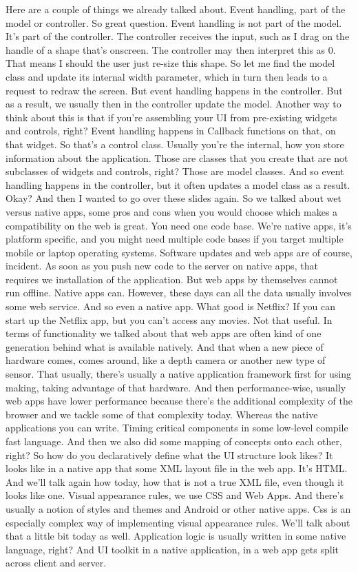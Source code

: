Here are a couple of things we already talked about. Event handling, part of the model or controller. So great question. Event handling is not part of the model. It's part of the controller. The controller receives the input, such as I drag on the handle of a shape that's onscreen. The controller may then interpret this as 0. That means I should the user just re-size this shape. So let me find the model class and update its internal width parameter, which in turn then leads to a request to redraw the screen. But event handling happens in the controller. But as a result, we usually then in the controller update the model. Another way to think about this is that if you're assembling your UI from pre-existing widgets and controls, right? Event handling happens in Callback functions on that, on that widget. So that's a control class. Usually you're the internal, how you store information about the application. Those are classes that you create that are not subclasses of widgets and controls, right? Those are model classes. And so event handling happens in the controller, but it often updates a model class as a result. Okay? And then I wanted to go over these slides again. So we talked about wet versus native apps, some pros and cons when you would choose which makes a compatibility on the web is great. You need one code base. We're native apps, it's platform specific, and you might need multiple code bases if you target multiple mobile or laptop operating systems. Software updates and web apps are of course, incident. As soon as you push new code to the server on native apps, that requires we installation of the application. But web apps by themselves cannot run offline. Native apps can. However, these days can all the data usually involves some web service. And so even a native app. What good is Netflix? If you can start up the Netflix app, but you can't access any movies. Not that useful. In terms of functionality we talked about that web apps are often kind of one generation behind what is available natively. And that when a new piece of hardware comes, comes around, like a depth camera or another new type of sensor. That usually, there's usually a native application framework first for using making, taking advantage of that hardware. And then performance-wise, usually web apps have lower performance because there's the additional complexity of the browser and we tackle some of that complexity today. Whereas the native applications you can write. Timing critical components in some low-level compile fast language. And then we also did some mapping of concepts onto each other, right? So how do you declaratively define what the UI structure look likes? It looks like in a native app that some XML layout file in the web app. It's HTML. And we'll talk again how today, how that is not a true XML file, even though it looks like one. Visual appearance rules, we use CSS and Web Apps. And there's usually a notion of styles and themes and Android or other native apps. Css is an especially complex way of implementing visual appearance rules. We'll talk about that a little bit today as well. Application logic is usually written in some native language, right? And UI toolkit in a native application, in a web app gets split across client and server. 

